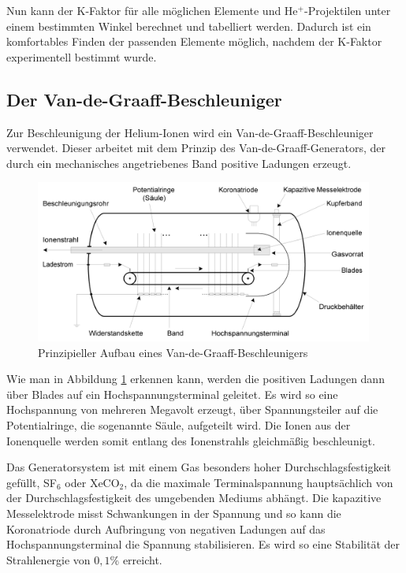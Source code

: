 Nun kann der K-Faktor für alle möglichen Elemente und He$^+$-Projektilen unter einem bestimmten Winkel berechnet und tabelliert werden. Dadurch ist ein komfortables Finden der passenden Elemente möglich, nachdem der K-Faktor experimentell bestimmt wurde.

\subsection{Der Van-de-Graaff-Beschleuniger}
Zur Beschleunigung der Helium-Ionen wird ein Van-de-Graaff-Beschleuniger verwendet. Dieser arbeitet mit dem Prinzip des Van-de-Graaff-Generators, der durch ein mechanisches angetriebenes Band positive Ladungen erzeugt.
\begin{figure}[htbp]  
     \includegraphics[width=0.99\textwidth]{van_de_graaff.png}
  \caption{Prinzipieller Aufbau eines Van-de-Graaff-Beschleunigers \cite{van_de_graaff}}
  \label{van_de_graaff}
\end{figure}

Wie man in Abbildung \ref{van_de_graaff} erkennen kann, werden die positiven Ladungen dann über Blades auf ein Hochspannungsterminal geleitet. Es wird so eine Hochspannung von mehreren Megavolt erzeugt, über Spannungsteiler auf die Potentialringe, die sogenannte Säule, aufgeteilt wird. Die Ionen aus der Ionenquelle werden somit entlang des Ionenstrahls gleichmäßig beschleunigt.

Das Generatorsystem ist mit einem Gas besonders hoher Durchschlagsfestigkeit gefüllt, SF$_6$ oder XeCO$_2$, da die maximale Terminalspannung hauptsächlich von der Durchschlagsfestigkeit des umgebenden Mediums abhängt. Die kapazitive Messelektrode misst Schwankungen in der Spannung und so kann die Koronatriode durch Aufbringung von negativen Ladungen auf das Hochspannungsterminal die Spannung stabilisieren. Es wird so eine Stabilität der Strahlenergie von $0,1\%$ erreicht.




